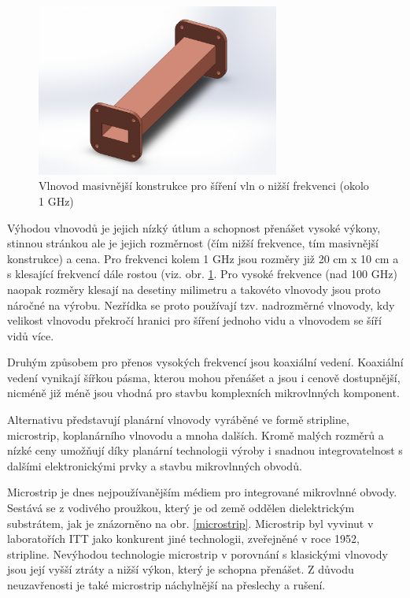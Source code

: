 \documentclass[12pt,a4paper,oneside]{article}
\numberwithin{equation}{section} %
\numberwithin{figure}{section} %
\numberwithin{table}{section} %
\begin{document}
\begin{figure}[h] 
\begin{center}
\includegraphics[width=8cm]{vlnovod.pdf}
\caption{Vlnovod masivnější konstrukce pro šíření vln o nižší frekvenci (okolo 1 GHz)}
\label{vlnovod}
\end{center}
\end{figure}

Výhodou vlnovodů je jejich nízký útlum a schopnost přenášet vysoké výkony, stinnou stránkou ale je jejich rozměrnost (čím nižší frekvence, tím masivnější konstrukce) a cena. Pro frekvenci kolem 1 GHz jsou rozměry již 20 cm x 10 cm a s klesající frekvencí dále rostou (viz. obr. \ref{vlnovod}. Pro vysoké frekvence (nad 100 GHz) naopak rozměry klesají na desetiny milimetru a takovéto vlnovody jsou proto náročné na výrobu. Nezřídka se proto používají tzv. nadrozměrné vlnovody, kdy velikost vlnovodu překročí hranici pro šíření jednoho vidu a vlnovodem se šíří vidů více. 

Druhým způsobem pro přenos vysokých frekvencí jsou koaxiální vedení. Koaxiální vedení vynikají šířkou pásma, kterou mohou přenášet a jsou i cenově dostupnější, nicméně již méně jsou vhodná pro stavbu komplexních mikrovlnných komponent.

Alternativu představují planární vlnovody vyráběné ve formě stripline, microstrip, koplanárního vlnovodu a mnoha dalších. Kromě malých rozměrů a nízké ceny umožňují díky planární technologii výroby i snadnou integrovatelnost s dalšími elektronickými prvky a stavbu mikrovlnných obvodů.

Microstrip je dnes nejpoužívanějším médiem pro integrované mikrovlnné obvody. Sestává se z vodivého proužkou, který je od země oddělen dielektrickým substrátem, jak je znázorněno na obr. \ref{microstrip}. Microstrip byl vyvinut v laboratořích ITT jako konkurent jiné technologii, zveřejněné v roce 1952, stripline. Nevýhodou technologie microstrip v porovnání s klasickými vlnovody jsou její vyšší ztráty a nižší výkon, který je schopna přenášet. Z důvodu neuzavřenosti je také microstrip náchylnější na přeslechy a rušení.
\end{document}
